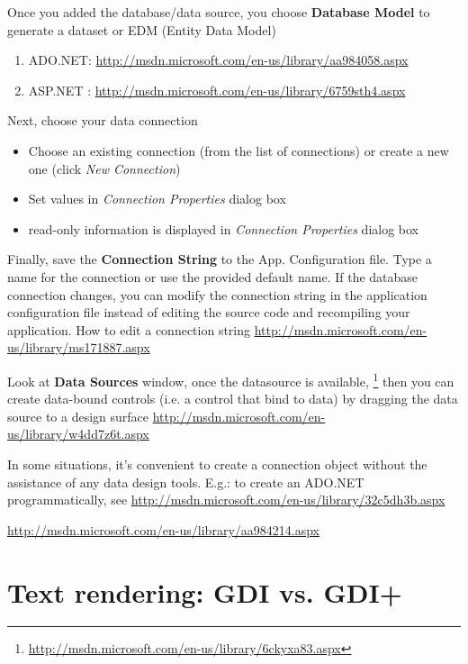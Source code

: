 Once you added the database/data source, you choose {\bf Database Model} to
generate a dataset or EDM (Entity Data Model)
\begin{enumerate}
  \item ADO.NET: \url{http://msdn.microsoft.com/en-us/library/aa984058.aspx}
   \item ASP.NET : \url{http://msdn.microsoft.com/en-us/library/6759sth4.aspx}
\end{enumerate}

Next, choose your data connection
\begin{itemize}
  \item Choose an existing connection (from the list of connections) or create a
  new one (click {\it New Connection})
  \item Set values in {\it Connection Properties} dialog box
  \item read-only information is displayed in {\it Connection Properties} dialog
  box
\end{itemize}

Finally, save the {\bf Connection String} to the App. Configuration file. Type a
name for the connection or use the provided default name. If the database
connection changes, you can modify the connection string in the application
configuration file instead of editing the source code and recompiling your
application. How to edit a connection string
\url{http://msdn.microsoft.com/en-us/library/ms171887.aspx}

Look at {\bf Data Sources} window, once the datasource is available,
\footnote{\url{http://msdn.microsoft.com/en-us/library/6ckyxa83.aspx}} then you
can create data-bound controls (i.e. a control that bind to data) by dragging
the data source to a design surface
\url{http://msdn.microsoft.com/en-us/library/w4dd7z6t.aspx}

\begin{mdframed}
In some situations, it's convenient to create a connection object without the
assistance of any data design tools. E.g.: to create an ADO.NET
programmatically, see
\url{http://msdn.microsoft.com/en-us/library/32c5dh3b.aspx}
\end{mdframed}

  


\url{http://msdn.microsoft.com/en-us/library/aa984214.aspx}


\section{Text rendering: GDI vs. GDI+}
\label{sec:text_rendering}

